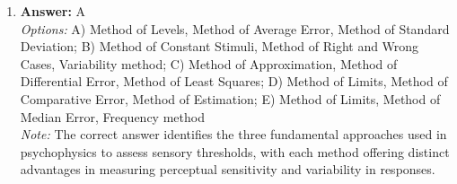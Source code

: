 \documentclass[12pt]{article}
\begin{document}
\begin{enumerate}[label=\arabic*.]
\\ \textit{Note:} The risk of withdrawal delirium is greatest following the discontinuation of ecstasy due to its effects on serotonin levels, leading to significant neurochemical imbalances that can trigger severe withdrawal symptoms.
\item \textbf{Answer:} A
\\ \textit{Options:} A) Method of Levels, Method of Average Error, Method of Standard Deviation; B) Method of Constant Stimuli, Method of Right and Wrong Cases, Variability method; C) Method of Approximation, Method of Differential Error, Method of Least Squares; D) Method of Limits, Method of Comparative Error, Method of Estimation; E) Method of Limits, Method of Median Error, Frequency method
\\ \textit{Note:} The correct answer identifies the three fundamental approaches used in psychophysics to assess sensory thresholds, with each method offering distinct advantages in measuring perceptual sensitivity and variability in responses.
\end{enumerate}
\end{document}
